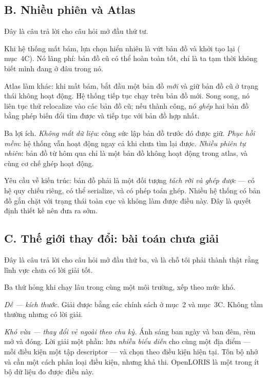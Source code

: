 \documentclass[../../vslam.tex]{subfiles}
\begin{document}
\subsection{B. Nhiều phiên và Atlas}

Đây là câu trả lời cho câu hỏi mở đầu thứ tư.

Khi hệ thống mất bám, lựa chọn hiển nhiên là vứt bản đồ và khởi tạo lại ( mục~4C). Nó lãng phí: bản đồ cũ có thể hoàn toàn tốt, chỉ là ta tạm thời không biết mình đang ở đâu trong nó.

Atlas \cite{campos2021orbslam3} làm khác: khi mất bám, bắt đầu một bản đồ \emph{mới} và giữ bản đồ cũ ở trạng thái không hoạt động. Hệ thống tiếp tục chạy trên bản đồ mới. Song song, nó liên tục thử relocalize vào các bản đồ cũ; nếu thành công, nó \emph{ghép} hai bản đồ bằng phép biến đổi tìm được và tiếp tục với bản đồ hợp nhất.

Ba lợi ích. \emph{Không mất dữ liệu}: công sức lập bản đồ trước đó được giữ. \emph{Phục hồi mềm}: hệ thống vẫn hoạt động ngay cả khi chưa tìm lại được. \emph{Nhiều phiên tự nhiên}: bản đồ từ hôm qua chỉ là một bản đồ không hoạt động trong atlas, và cùng cơ chế ghép hoạt động.

Yêu cầu về kiến trúc: bản đồ phải là một đối tượng \emph{tách rời và ghép được} --- có hệ quy chiếu riêng, có thể serialize, và có phép toán ghép. Nhiều hệ thống có bản đồ gắn chặt với trạng thái toàn cục và không làm được điều này. Đây là quyết định thiết kế nên đưa ra sớm.

\subsection{C. Thế giới thay đổi: bài toán chưa giải}

Đây là câu trả lời cho câu hỏi mở đầu thứ ba, và là chỗ tôi phải thành thật rằng lĩnh vực chưa có lời giải tốt.

Ba thứ hỏng khi chạy lâu trong cùng một môi trường, xếp theo mức khó.

\emph{Dễ --- kích thước.} Giải được bằng các chính sách ở mục~2 và mục~3C. Không tầm thường nhưng có lời giải.

\emph{Khó vừa --- thay đổi vẻ ngoài theo chu kỳ.} Ánh sáng ban ngày và ban đêm, rèm mở và đóng. Lời giải một phần: lưu \emph{nhiều biểu diễn} cho cùng một địa điểm --- mỗi điều kiện một tập descriptor --- và chọn theo điều kiện hiện tại. Tốn bộ nhớ và cần một cách phân loại điều kiện, nhưng khả thi. OpenLORIS \cite{shi2020openloris} là một trong ít bộ dữ liệu đo được điều này.
\end{document}
